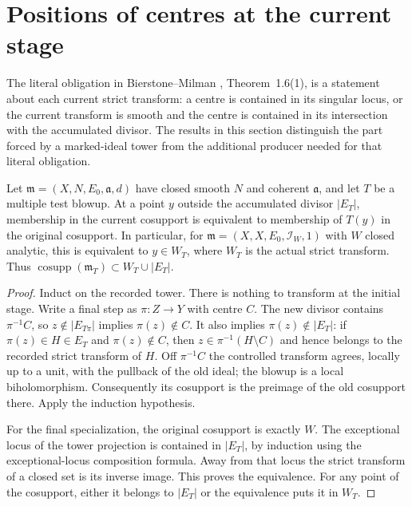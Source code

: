 \section{Positions of centres at the current stage}

The literal obligation in Bierstone--Milman \cite{bierstone-milman97-invent-math},
Theorem~1.6(1), is a statement about each current strict transform: a centre is
contained in its singular locus, or the current transform is smooth and the
centre is contained in its intersection with the accumulated divisor. The
results in this section distinguish the part forced by a marked-ideal tower
from the additional producer needed for that literal obligation.

\begin{lemma}
\label{hir:stage-cosupport-off-boundary}
\leanok
Let $\mathfrak m=(X,N,E_0,\mathfrak a,d)$ have closed smooth $N$ and coherent
$\mathfrak a$, and let $T$ be a multiple test blowup. At a point $y$ outside
the accumulated divisor $|E_T|$, membership in the current cosupport is
equivalent to membership of $T(y)$ in the original cosupport. In particular,
for $\mathfrak m=(X,X,E_0,\mathcal I_W,1)$ with $W$ closed analytic, this is
equivalent to $y\in W_T$, where $W_T$ is the actual strict transform. Thus
$\operatorname{cosupp}(\mathfrak m_T)\subset W_T\cup|E_T|$.
\end{lemma}
\begin{proof}
Induct on the recorded tower. There is nothing to transform at the initial
stage. Write a final step as $\pi:Z\to Y$ with centre $C$. The new divisor
contains $\pi^{-1}C$, so $z\notin|E_{T\pi}|$ implies $\pi(z)\notin C$.
It also implies $\pi(z)\notin|E_T|$: if $\pi(z)\in H\in E_T$ and
$\pi(z)\notin C$, then $z\in\pi^{-1}(H\setminus C)$ and hence belongs
to the recorded strict transform of $H$. Off $\pi^{-1}C$ the controlled
transform agrees, locally up to a unit, with the pullback of the old ideal;
the blowup is a local biholomorphism. Consequently its cosupport is the
preimage of the old cosupport there. Apply the induction hypothesis.

For the final specialization, the original cosupport is exactly $W$. The
exceptional locus of the tower projection is contained in $|E_T|$, by
induction using the exceptional-locus composition formula. Away from that
locus the strict transform of a closed set is its inverse image. This proves
the equivalence. For any point of the cosupport, either it belongs to $|E_T|$
or the equivalence puts it in $W_T$.
\end{proof}

